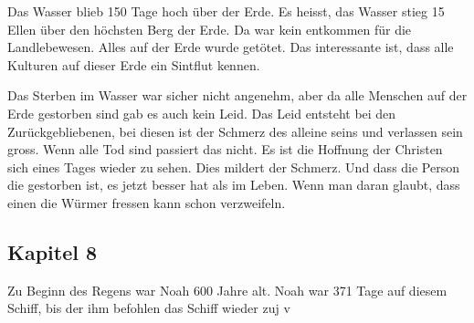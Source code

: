 Das Wasser blieb 150 Tage hoch über der Erde. Es heisst, das Wasser stieg 15 Ellen über den höchsten Berg der Erde. Da war kein entkommen für die Landlebewesen. Alles auf der Erde wurde getötet. Das interessante ist, dass alle Kulturen auf dieser Erde ein Sintflut kennen.

Das Sterben im Wasser war sicher nicht angenehm, aber da alle Menschen auf der Erde gestorben sind gab es auch kein Leid. Das Leid entsteht bei den Zurückgebliebenen, bei diesen ist der Schmerz des alleine seins und verlassen sein gross. Wenn alle Tod sind passiert das nicht. Es ist die Hoffnung der Christen sich eines Tages wieder zu sehen. Dies mildert der Schmerz. Und dass die Person die gestorben ist, es jetzt besser hat als im Leben. Wenn man daran glaubt, dass einen die Würmer fressen kann schon verzweifeln.
\subsection{Kapitel 8}
Zu Beginn des Regens war Noah 600 Jahre alt. Noah war 371 Tage auf diesem Schiff, bis der \herr ihm befohlen das Schiff wieder zuj v